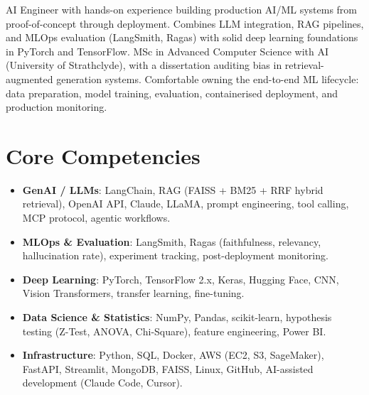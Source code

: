 \documentclass[11pt,a4paper,sans]{moderncv}
\begin{document}
\makecvtitle


\vspace{6pt}
\small{AI Engineer with hands-on experience building production AI/ML systems from proof-of-concept through deployment. Combines LLM integration, RAG pipelines, and MLOps evaluation (LangSmith, Ragas) with solid deep learning foundations in PyTorch and TensorFlow. MSc in Advanced Computer Science with AI (University of Strathclyde), with a dissertation auditing bias in retrieval-augmented generation systems. Comfortable owning the end-to-end ML lifecycle: data preparation, model training, evaluation, containerised deployment, and production monitoring.}


\section{Core Competencies}
\vspace{1pt}
\begin{itemize}

\item \textbf{GenAI / LLMs}: LangChain, RAG (FAISS + BM25 + RRF hybrid retrieval), OpenAI API, Claude, LLaMA, prompt engineering, tool calling, MCP protocol, agentic workflows.

\item \textbf{MLOps \& Evaluation}: LangSmith, Ragas (faithfulness, relevancy, hallucination rate), experiment tracking, post-deployment monitoring.

\item \textbf{Deep Learning}: PyTorch, TensorFlow 2.x, Keras, Hugging Face, CNN, Vision Transformers, transfer learning, fine-tuning.

\item \textbf{Data Science \& Statistics}: NumPy, Pandas, scikit-learn, hypothesis testing (Z-Test, ANOVA, Chi-Square), feature engineering, Power BI.

\item \textbf{Infrastructure}: Python, SQL, Docker, AWS (EC2, S3, SageMaker), FastAPI, Streamlit, MongoDB, FAISS, Linux, GitHub, AI-assisted development (Claude Code, Cursor).

\end{itemize}
\end{document}
